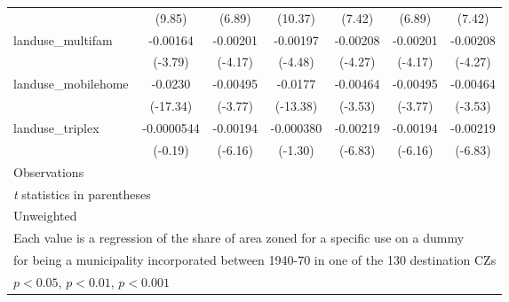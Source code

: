 \begin{table}[htbp]
\begin{tabular}{l*{6}{c}}
                    &      (9.85)         &      (6.89)         &     (10.37)         &      (7.42)         &      (6.89)         &      (7.42)         \\
\addlinespace
landuse\_multifam    &    -0.00164\sym{***}&    -0.00201\sym{***}&    -0.00197\sym{***}&    -0.00208\sym{***}&    -0.00201\sym{***}&    -0.00208\sym{***}\\
                    &     (-3.79)         &     (-4.17)         &     (-4.48)         &     (-4.27)         &     (-4.17)         &     (-4.27)         \\
\addlinespace
landuse\_mobilehome  &     -0.0230\sym{***}&    -0.00495\sym{***}&     -0.0177\sym{***}&    -0.00464\sym{***}&    -0.00495\sym{***}&    -0.00464\sym{***}\\
                    &    (-17.34)         &     (-3.77)         &    (-13.38)         &     (-3.53)         &     (-3.77)         &     (-3.53)         \\
\addlinespace
landuse\_triplex     &  -0.0000544         &    -0.00194\sym{***}&   -0.000380         &    -0.00219\sym{***}&    -0.00194\sym{***}&    -0.00219\sym{***}\\
                    &     (-0.19)         &     (-6.16)         &     (-1.30)         &     (-6.83)         &     (-6.16)         &     (-6.83)         \\
\midrule
Observations        &                     &                     &                     &                     &                     &                     \\
\bottomrule
\multicolumn{7}{l}{\footnotesize \textit{t} statistics in parentheses}\\
\multicolumn{7}{l}{\footnotesize Unweighted}\\
\multicolumn{7}{l}{\footnotesize Each value is a regression of the share of area zoned for a specific use on a dummy}\\
\multicolumn{7}{l}{\footnotesize for being a municipality incorporated between 1940-70 in one of the 130 destination CZs}\\
\multicolumn{7}{l}{\footnotesize \sym{*} \(p<0.05\), \sym{**} \(p<0.01\), \sym{***} \(p<0.001\)}\\
\end{tabular}
\end{table}
